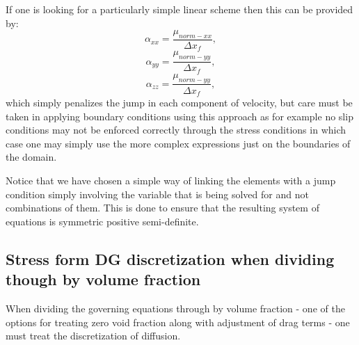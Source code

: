 If one is looking for a particularly simple linear scheme then this can 
be provided by:
\begin{equation}
\alpha_{xx}=\frac{\mu_{norm-xx}}{\Delta x_f},
\end{equation} 
\begin{equation}
\alpha_{yy}=\frac{\mu_{norm-yy}}{\Delta x_f},
\end{equation} 
\begin{equation}
\alpha_{zz}=\frac{\mu_{norm-yy}}{\Delta x_f},
\end{equation} 
which simply penalizes the jump in each component of velocity, but care 
must be taken in applying boundary conditions using this approach as 
for example no slip conditions may not be enforced correctly through the 
stress conditions in which case one may simply use the more complex expressions 
just on the boundaries of the domain. 

Notice that we have chosen a simple way of linking the 
elements with a jump condition simply involving the 
variable that is being solved for and not combinations 
of them. This is done to ensure that the 
resulting system of equations is symmetric positive semi-definite. 



\subsection{Stress form DG discretization when dividing though by volume fraction} 
When dividing the governing equations through by volume fraction - one of 
the options for treating zero void fraction along with adjustment of drag terms - 
one must treat the discretization of diffusion. 


